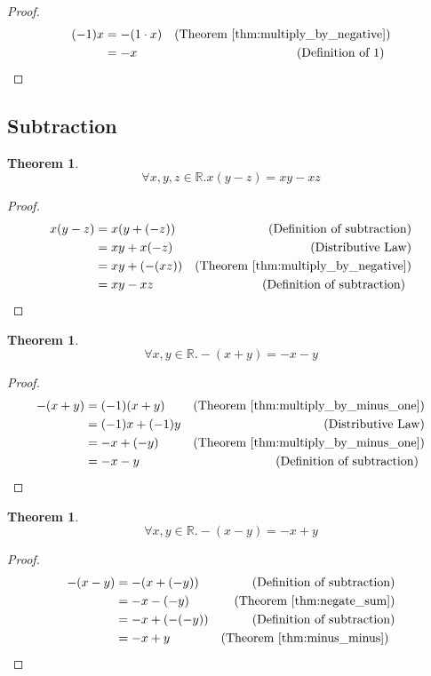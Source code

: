 \documentclass{book}
\let\qed\relax
\newtheorem{thm}[ax]{Theorem}
\theoremstyle{definition}
\begin{document}
\begin{proof}
\pf
\begin{align*}
	(-1)x & = -(1\cdot x) & (\text{Theorem \ref{thm:multiply_by_negative}}) \\
	& = -x & (\text{Definition of } 1) \enspace \qed
\end{align*}
\end{proof}

\subsection{Subtraction}

\begin{thm}
\[ \forall x,y,z \in \mathbb{R}. x(y-z) = xy-xz \]
\end{thm}

\begin{proof}
\pf
\begin{align*}
x (y-z) & = x(y + (-z)) & (\text{Definition of subtraction}) \\
& = xy + x(-z) & (\text{Distributive Law}) \\
& = xy + (-(xz)) & (\text{Theorem \ref{thm:multiply_by_negative}}) \\
& = xy - xz & (\text{Definition of subtraction}) \enspace \qed
\end{align*}
\end{proof}

\begin{thm}
\label{thm:negate_sum}
\[ \forall x,y \in \mathbb{R}. -(x+y) = -x-y \]
\end{thm}

\begin{proof}
\pf
\begin{align*}
-(x+y) & = (-1)(x+y) & (\text{Theorem \ref{thm:multiply_by_minus_one}}) \\
& = (-1)x + (-1)y & (\text{Distributive Law}) \\
& = -x + (-y) & (\text{Theorem \ref{thm:multiply_by_minus_one}}) \\
& = -x-y & (\text{Definition of subtraction}) \enspace \qed
\end{align*}
\end{proof}

\begin{thm}
\[ \forall x,y \in \mathbb{R}. -(x-y) = -x+y \]
\end{thm}

\begin{proof}
\pf
\begin{align*}
-(x-y) & = -(x + (-y)) & (\text{Definition of subtraction}) \\
& = -x-(-y) & (\text{Theorem \ref{thm:negate_sum}}) \\
& = -x + (-(-y)) & (\text{Definition of subtraction}) \\
& = -x + y & (\text{Theorem \ref{thm:minus_minus}}) \enspace \qed
\end{align*}
\end{proof}
\end{document}
